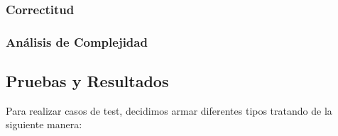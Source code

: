 \subsubsection{Correctitud}



\subsubsection{Análisis de Complejidad}



\subsection{Pruebas y Resultados}


\quad Para realizar casos de test, decidimos armar diferentes tipos tratando de la siguiente manera:

